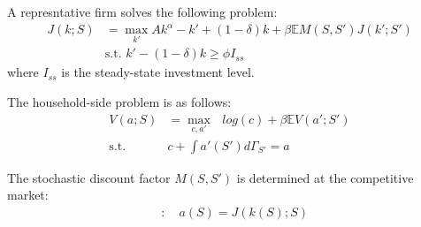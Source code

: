 A represntative firm solves the following problem:
\begin{align*}
  J(k;S) &= \max_{k'} Ak^{\alpha}  -k' + (1-\delta)k + \beta\mathbb{E}M(S,S')J(k';S')
  \\
  &\text{s.t. } k' - (1-\delta)k \geq \phi I_{ss}
\end{align*}
where $I_{ss}$ is the steady-state investment level.

The household-side problem is as follows:
\begin{align*}
  V(a;S) &= \max_{c,a'}\text{ } log(c) + \beta \mathbb{E}V(a';S')
  \\
  \text{s.t.}\quad& c + \int a'(S') d\Gamma_{S'} =  a
\end{align*}

The stochastic discount factor $M(S,S')$ is determined at the competitive market:
\begin{align*}
  [M]&:\quad a(S) = J(k(S);S)
\end{align*}

